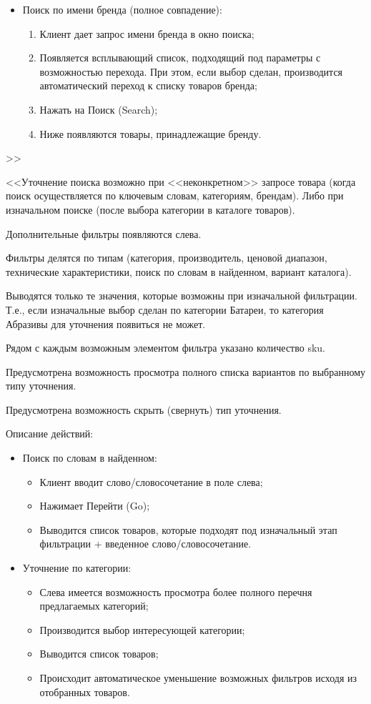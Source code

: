 {\begin{itemize}
\item	Поиск по имени бренда (полное совпадение):
 	\begin{enumerate} 
		\item	Клиент дает запрос имени бренда в окно поиска;
		\item	Появляется всплывающий список, подходящий под параметры с возможностью перехода. При этом, если выбор сделан, производится автоматический переход к списку товаров бренда;
		\item	Нажать на Поиск (Search);
		\item	Ниже появляются товары, принадлежащие бренду.
	\end{enumerate}	
\end{itemize}>>
}
{
<<Уточнение поиска возможно при <<неконкретном>> запросе товара (когда поиск осуществляется по ключевым словам, категориям, брендам). Либо при изначальном поиске (после выбора категории в каталоге товаров).

Дополнительные фильтры появляются слева.

Фильтры делятся по типам (категория, производитель, ценовой диапазон, технические характеристики, поиск по словам в найденном, вариант каталога).

Выводятся только те значения, которые возможны при изначальной фильтрации. Т.е., если изначальные выбор сделан по категории Батареи, то категория Абразивы для уточнения появиться не может.

Рядом с каждым возможным элементом фильтра указано количество sku.

Предусмотрена возможность просмотра полного списка вариантов по выбранному типу уточнения.

Предусмотрена возможность скрыть (свернуть) тип уточнения.

Описание действий:
\begin{itemize}
\item Поиск по словам в найденном:
	\begin{itemize}
		\item Клиент вводит слово/словосочетание в поле слева;
		\item Нажимает Перейти (Go);
		\item Выводится список товаров, которые подходят под изначальный этап фильтрации + введенное слово/словосочетание.
	\end{itemize}

\item Уточнение по категории:
	\begin{itemize}
		\item Слева имеется возможность просмотра более полного перечня предлагаемых категорий;
		\item Производится выбор интересующей категории;
		\item Выводится список товаров;
		\item Происходит автоматическое уменьшение возможных фильтров исходя из отобранных товаров.
	\end{itemize}


\end{itemize}}
